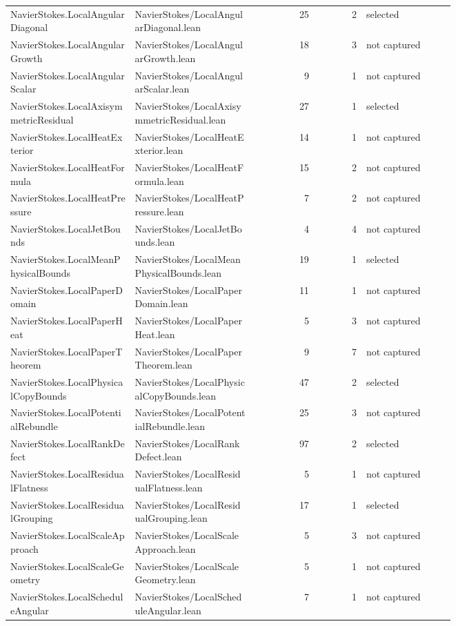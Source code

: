 \documentclass[10pt]{article}
\begin{document}
\begin{longtable}{p{0.28\linewidth}p{0.27\linewidth}r r p{0.20\linewidth}}
NavierStokes.LocalAngularDiagonal & NavierStokes/LocalAngularDiagonal.lean & 25 & 2 & selected\\
NavierStokes.LocalAngularGrowth & NavierStokes/LocalAngularGrowth.lean & 18 & 3 & not captured\\
NavierStokes.LocalAngularScalar & NavierStokes/LocalAngularScalar.lean & 9 & 1 & not captured\\
NavierStokes.LocalAxisymmetricResidual & NavierStokes/LocalAxisymmetricResidual.lean & 27 & 1 & selected\\
NavierStokes.LocalHeatExterior & NavierStokes/LocalHeatExterior.lean & 14 & 1 & not captured\\
NavierStokes.LocalHeatFormula & NavierStokes/LocalHeatFormula.lean & 15 & 2 & not captured\\
NavierStokes.LocalHeatPressure & NavierStokes/LocalHeatPressure.lean & 7 & 2 & not captured\\
NavierStokes.LocalJetBounds & NavierStokes/LocalJetBounds.lean & 4 & 4 & not captured\\
NavierStokes.LocalMeanPhysicalBounds & NavierStokes/LocalMeanPhysicalBounds.lean & 19 & 1 & selected\\
NavierStokes.LocalPaperDomain & NavierStokes/LocalPaperDomain.lean & 11 & 1 & not captured\\
NavierStokes.LocalPaperHeat & NavierStokes/LocalPaperHeat.lean & 5 & 3 & not captured\\
NavierStokes.LocalPaperTheorem & NavierStokes/LocalPaperTheorem.lean & 9 & 7 & not captured\\
NavierStokes.LocalPhysicalCopyBounds & NavierStokes/LocalPhysicalCopyBounds.lean & 47 & 2 & selected\\
NavierStokes.LocalPotentialRebundle & NavierStokes/LocalPotentialRebundle.lean & 25 & 3 & not captured\\
NavierStokes.LocalRankDefect & NavierStokes/LocalRankDefect.lean & 97 & 2 & selected\\
NavierStokes.LocalResidualFlatness & NavierStokes/LocalResidualFlatness.lean & 5 & 1 & not captured\\
NavierStokes.LocalResidualGrouping & NavierStokes/LocalResidualGrouping.lean & 17 & 1 & selected\\
NavierStokes.LocalScaleApproach & NavierStokes/LocalScaleApproach.lean & 5 & 3 & not captured\\
NavierStokes.LocalScaleGeometry & NavierStokes/LocalScaleGeometry.lean & 5 & 1 & not captured\\
NavierStokes.LocalScheduleAngular & NavierStokes/LocalScheduleAngular.lean & 7 & 1 & not captured\\

\end{longtable}
\end{document}
